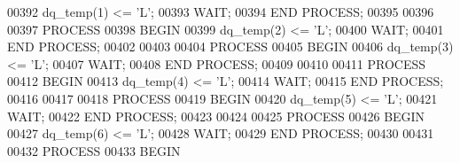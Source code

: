 \begin{DoxyCode}
00392     \textcolor{vhdlchar}{dq_temp}\textcolor{vhdlchar}{(}\textcolor{vhdllogic}{}\textcolor{vhdllogic}{1}\textcolor{vhdlchar}{)} \textcolor{vhdlchar}{<=} \textcolor{vhdlchar}{'}\textcolor{vhdlchar}{L}\textcolor{vhdlchar}{'};  
00393   \textcolor{keywordflow}{WAIT};
00394   \textcolor{keywordflow}{END} \textcolor{keywordflow}{PROCESS};
00395   
00396   
00397   \textcolor{keywordflow}{PROCESS}
00398   \textcolor{keywordflow}{BEGIN}
00399     \textcolor{vhdlchar}{dq_temp}\textcolor{vhdlchar}{(}\textcolor{vhdllogic}{}\textcolor{vhdllogic}{2}\textcolor{vhdlchar}{)} \textcolor{vhdlchar}{<=} \textcolor{vhdlchar}{'}\textcolor{vhdlchar}{L}\textcolor{vhdlchar}{'};  
00400   \textcolor{keywordflow}{WAIT};
00401   \textcolor{keywordflow}{END} \textcolor{keywordflow}{PROCESS};
00402   
00403   
00404   \textcolor{keywordflow}{PROCESS}
00405   \textcolor{keywordflow}{BEGIN}
00406     \textcolor{vhdlchar}{dq_temp}\textcolor{vhdlchar}{(}\textcolor{vhdllogic}{}\textcolor{vhdllogic}{3}\textcolor{vhdlchar}{)} \textcolor{vhdlchar}{<=} \textcolor{vhdlchar}{'}\textcolor{vhdlchar}{L}\textcolor{vhdlchar}{'};  
00407   \textcolor{keywordflow}{WAIT};
00408   \textcolor{keywordflow}{END} \textcolor{keywordflow}{PROCESS};
00409   
00410   
00411   \textcolor{keywordflow}{PROCESS}
00412   \textcolor{keywordflow}{BEGIN}
00413     \textcolor{vhdlchar}{dq_temp}\textcolor{vhdlchar}{(}\textcolor{vhdllogic}{}\textcolor{vhdllogic}{4}\textcolor{vhdlchar}{)} \textcolor{vhdlchar}{<=} \textcolor{vhdlchar}{'}\textcolor{vhdlchar}{L}\textcolor{vhdlchar}{'};  
00414   \textcolor{keywordflow}{WAIT};
00415   \textcolor{keywordflow}{END} \textcolor{keywordflow}{PROCESS};
00416   
00417   
00418   \textcolor{keywordflow}{PROCESS}
00419   \textcolor{keywordflow}{BEGIN}
00420     \textcolor{vhdlchar}{dq_temp}\textcolor{vhdlchar}{(}\textcolor{vhdllogic}{}\textcolor{vhdllogic}{5}\textcolor{vhdlchar}{)} \textcolor{vhdlchar}{<=} \textcolor{vhdlchar}{'}\textcolor{vhdlchar}{L}\textcolor{vhdlchar}{'};  
00421   \textcolor{keywordflow}{WAIT};
00422   \textcolor{keywordflow}{END} \textcolor{keywordflow}{PROCESS};
00423   
00424   
00425   \textcolor{keywordflow}{PROCESS}
00426   \textcolor{keywordflow}{BEGIN}
00427     \textcolor{vhdlchar}{dq_temp}\textcolor{vhdlchar}{(}\textcolor{vhdllogic}{}\textcolor{vhdllogic}{6}\textcolor{vhdlchar}{)} \textcolor{vhdlchar}{<=} \textcolor{vhdlchar}{'}\textcolor{vhdlchar}{L}\textcolor{vhdlchar}{'};  
00428   \textcolor{keywordflow}{WAIT};
00429   \textcolor{keywordflow}{END} \textcolor{keywordflow}{PROCESS};
00430   
00431   
00432   \textcolor{keywordflow}{PROCESS}
00433   \textcolor{keywordflow}{BEGIN}

\end{DoxyCode}
